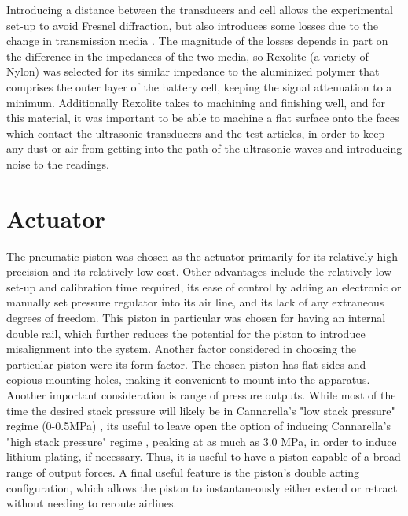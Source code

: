 Introducing a distance between the transducers and cell allows the experimental set-up to avoid Fresnel diffraction, but also introduces some losses due to the change in transmission media . The magnitude of the losses depends in part on the difference in the impedances of the two media, so Rexolite (a variety of Nylon) was selected for its similar impedance to the aluminized polymer that comprises the outer layer of the battery cell, keeping the signal attenuation to a minimum. Additionally Rexolite takes to machining and finishing well, and for this material, it was important to be able to machine a flat surface onto the faces which contact the ultrasonic transducers and the test articles, in order to keep any dust or air from getting into the path of the ultrasonic waves and introducing noise to the readings.
 
\section{Actuator}
The pneumatic piston was chosen as the actuator primarily for its relatively high precision and its relatively low cost. Other advantages include the relatively low set-up and calibration time required, its ease of control by adding an electronic or manually set pressure regulator into its air line, and its lack of any extraneous degrees of freedom. This piston in particular was chosen for having an internal double rail, which further reduces the potential for the piston to introduce misalignment into the system. Another factor considered in choosing the particular piston were its form factor. The chosen piston has flat sides and copious mounting holes, making it convenient to mount into the apparatus. Another important consideration is range of pressure outputs. While most of the time the desired stack pressure will likely be in Cannarella's "low stack pressure" regime (0-0.5MPa) \cite{STACK-STRESS}, its useful to leave open the option of inducing Cannarella's "high stack pressure" regime \cite{STACK-STRESS}, peaking at as much as 3.0 MPa, in order to induce lithium plating, if necessary.  Thus, it is useful to have a piston capable of a broad range of output forces. A final useful feature is the piston's double acting configuration, which allows the piston to instantaneously either extend or retract without needing to reroute airlines.
    